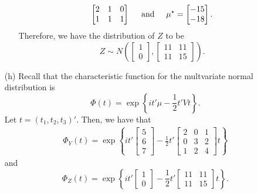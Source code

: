 \documentclass[11pt]{article}
\begin{document}
\begin{itemize}
\begin{itemize}
\[\begin{bmatrix}
2 & 1 & 0 \\
1 & 1 & 1
\end{bmatrix} \hspace{5mm}\text{and}\hspace{5mm}\mu^\star = \begin{bmatrix}
-15 \\ -18
\end{bmatrix}.
\]
Therefore, we have the distribution of $Z$ to be
\[
Z \sim N\left(\begin{bmatrix}
1 \\ 0
\end{bmatrix}, \begin{bmatrix}
11 & 11 \\
11 & 15
\end{bmatrix}\right).
\]
\end{itemize}
\item[(h)]  Recall that the characteristic function for the multvariate normal distribution is
\[
\Phi(t) = \exp\left\{it'\mu - \frac{1}{2}t'Vt\right\}.
\]
Let $t = (t_1,t_2,t_3)'$.  Then, we have that
\begin{align*}
\Phi_Y(t) = \exp\left\{it'\begin{bmatrix}
5 \\ 6 \\ 7
\end{bmatrix} - \frac{1}{2}t'\begin{bmatrix}
2 & 0 & 1 \\
0 & 3 & 2 \\
1 & 2 & 4
\end{bmatrix}t\right\}
\end{align*}
and
\[
\Phi_Z(t) = \exp\left\{it'\begin{bmatrix}
1 \\ 0
\end{bmatrix} - \frac{1}{2}t'\begin{bmatrix}
11 & 11 \\
11 & 15
\end{bmatrix}t\right\}.
\]
\end{itemize}
\end{document}
